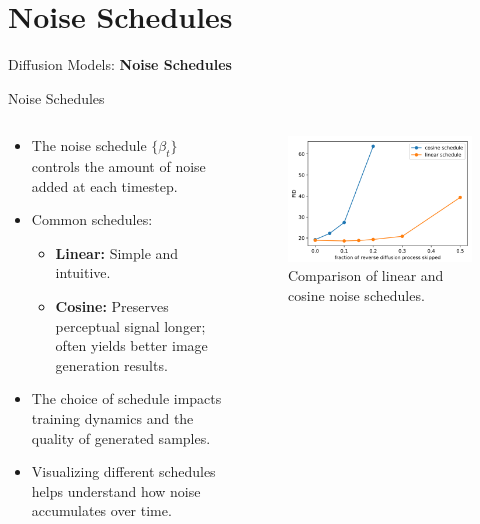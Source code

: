 \section{Noise Schedules}
\begin{frame}{}
    \LARGE Diffusion Models: \textbf{Noise Schedules}
\end{frame}


\begin{frame}{Noise Schedules}
    \begin{columns}
    \begin{column}{0.45\textwidth}
       \begin{itemize}
            \item The noise schedule $\{\beta_t\}$ controls the amount of noise added at each timestep.
            \item<2-> Common schedules:
            \begin{itemize}
                \item \textbf{Linear:} Simple and intuitive.
                \item \textbf{Cosine:} Preserves perceptual signal longer; often yields better image generation results.
            \end{itemize}
            \item<3-> The choice of schedule impacts training dynamics and the quality of generated samples.
            \item<4-> Visualizing different schedules helps understand how noise accumulates over time.
        \end{itemize}
    \end{column}
    \begin{column}{0.55\textwidth}
        \begin{figure}
            \centering
            \includegraphics[height=\textheight, width=\textwidth, keepaspectratio]{images/diffusion/noise_schedules.png}
            \caption*{Comparison of linear and cosine noise schedules.}
        \end{figure}
    \end{column}
\end{columns}
\end{frame}